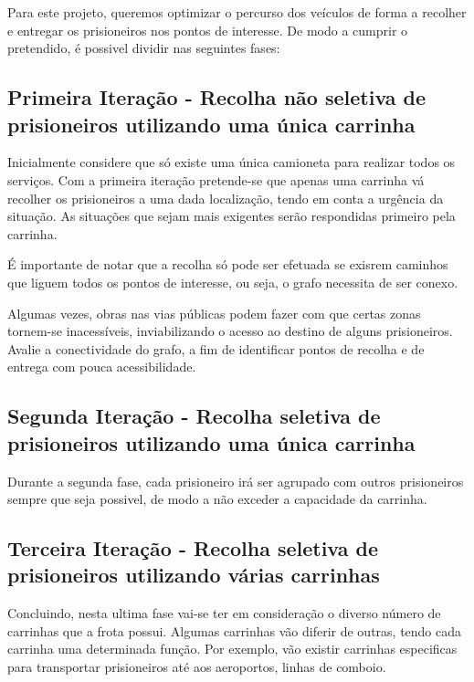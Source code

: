 \documentclass[article, a4paper, 12pt, oneside]{memoir}
\begin{document}
Para este projeto, queremos optimizar o percurso dos veículos de forma a recolher e entregar os prisioneiros nos pontos de interesse. De modo a cumprir o pretendido, é possivel dividir nas seguintes fases:


\subsection{Primeira Iteração - Recolha não seletiva de prisioneiros utilizando uma única carrinha}
	Inicialmente considere que só existe uma única camioneta para realizar todos os serviços.
	Com a primeira iteração pretende-se que apenas uma carrinha vá recolher os prisioneiros a uma dada localização, tendo em conta a urgência da situação. As situações que  sejam mais exigentes serão respondidas primeiro pela carrinha. 
	
	É importante de notar que a recolha só pode ser efetuada se exisrem caminhos que liguem todos os pontos de interesse, ou seja, o grafo necessita de ser conexo.
	
	Algumas vezes, obras nas vias públicas podem fazer com que certas zonas tornem-se inacessíveis, inviabilizando o acesso ao destino de alguns prisioneiros. Avalie a conectividade do grafo, a fim de identificar pontos de recolha e de entrega com pouca acessibilidade.

\subsection{Segunda Iteração - Recolha seletiva de prisioneiros utilizando uma única carrinha}
	Durante a segunda fase, cada prisioneiro irá ser agrupado com outros prisioneiros sempre que seja possivel, de modo a não exceder a capacidade da carrinha.
	 


\subsection{Terceira Iteração - Recolha seletiva de prisioneiros utilizando várias carrinhas}

	Concluindo, nesta ultima fase vai-se ter em consideração o diverso número de carrinhas que a frota possui. Algumas carrinhas vão diferir de outras, tendo cada carrinha uma determinada função. Por exemplo, vão existir carrinhas especificas para transportar prisioneiros até aos aeroportos, linhas de comboio.


\newpage
\end{document}
